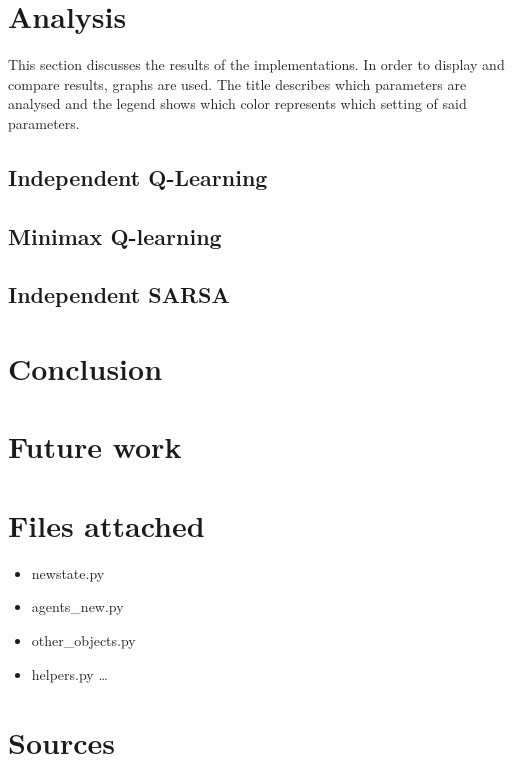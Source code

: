 \documentclass{article}
\begin{document}
\pagebreak


\section{Analysis}
This section discusses the results of the implementations. In order to display and compare results, graphs are used. The title describes which parameters are analysed and the legend shows which color represents which setting of said parameters.

\subsection{Independent Q-Learning}

\subsection{Minimax Q-learning}

\subsection{Independent SARSA}
%
\pagebreak


\section{Conclusion}

\pagebreak


\section{Future work}

\pagebreak


\section{Files attached}

\begin{itemize}
\item newstate.py
\item agents\_new.py
\item other\_objects.py
\item helpers.py \ldots
\end{itemize}


\section{Sources}

\nocite{*}
\printbibliography


\begin{comment}


\begin{itemize}
	\item [1] Barto and Sutton (http://webdocs.cs.ualberta.ca/~sutton/book/the-book.html) \ldots
\end{itemize}
\end{comment}
\end{document}
